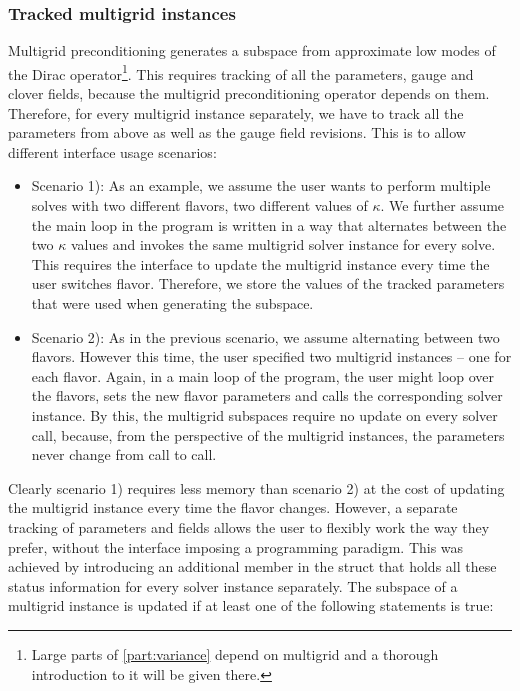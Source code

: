 \subsubsection{Tracked multigrid instances}

Multigrid preconditioning generates a subspace from approximate low modes of the Dirac operator\footnote{Large parts of \cref{part:variance} depend on multigrid and a thorough introduction to it will be given there.}.
This requires tracking of all the parameters, gauge and clover fields, because the multigrid preconditioning operator depends on them.
Therefore, for every multigrid instance separately, we have to track all the parameters from above as well as the gauge field revisions.
This is to allow different interface usage scenarios:
\begin{itemize}
  \item Scenario 1): As an example, we assume the user wants to perform multiple solves with two different flavors, \ie two different values of $\kappa$. We further assume the main loop in the program is written in a way that alternates between the two $\kappa$ values and invokes the same multigrid solver instance for every solve. This requires the interface to update the multigrid instance every time the user switches flavor. Therefore, we store the values of the tracked parameters that were used when generating the subspace.
  \item Scenario 2): As in the previous scenario, we assume alternating between two flavors. However this time, the user specified two multigrid instances -- one for each flavor. Again, in a main loop of the program, the user might loop over the flavors, sets the new flavor parameters and calls the corresponding solver instance. By this, the multigrid subspaces require no update on every solver call, because, from the perspective of the multigrid instances, the parameters never change from call to call.
\end{itemize}
Clearly scenario 1) requires less memory than scenario 2) at the cost of updating the multigrid instance every time the flavor changes.
However, a separate tracking of parameters and fields allows the user to flexibly work the way they prefer, without the interface imposing a programming paradigm.
This was achieved by introducing an additional member in the  struct that holds all these status information for every solver instance separately.
The subspace of a multigrid instance is updated if at least one of the following statements is true:
